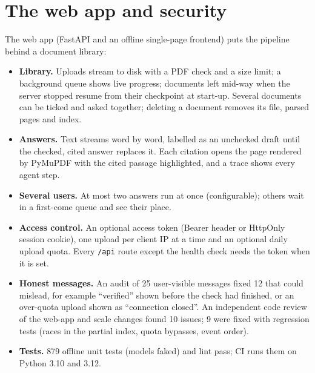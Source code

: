 \documentclass[10pt,a4paper]{article}
\begin{document}
\section{The web app and security}
The web app (FastAPI and an offline single-page frontend) puts the pipeline behind a document library:
\begin{itemize}
  \item \textbf{Library.} Uploads stream to disk with a PDF check and a size limit; a background queue shows live progress; documents left mid-way when the server stopped resume from their checkpoint at start-up.
        Several documents can be ticked and asked together; deleting a document removes its file, parsed pages and index.
  \item \textbf{Answers.} Text streams word by word, labelled as an unchecked draft until the checked, cited answer replaces it. Each citation opens the page rendered by PyMuPDF with the cited passage highlighted,
        and a trace shows every agent step.
  \item \textbf{Several users.} At most two answers run at once (configurable); others wait in a first-come queue and see their place.
  \item \textbf{Access control.} An optional access token (Bearer header or HttpOnly session cookie), one upload per client IP at a time and an optional daily upload quota.
        Every \texttt{/api} route except the health check needs the token when it is set.
  \item \textbf{Honest messages.} An audit of 25 user-visible messages fixed 12 that could mislead, for example ``verified'' shown before the check had finished, or an over-quota upload shown as ``connection closed''.
        An independent code review of the web-app and scale changes found 10 issues; 9 were fixed with regression tests (races in the partial index, quota bypasses, event order).
  \item \textbf{Tests.} 879 offline unit tests (models faked) and lint pass; CI runs them on Python 3.10 and 3.12.
\end{itemize}

\end{document}
